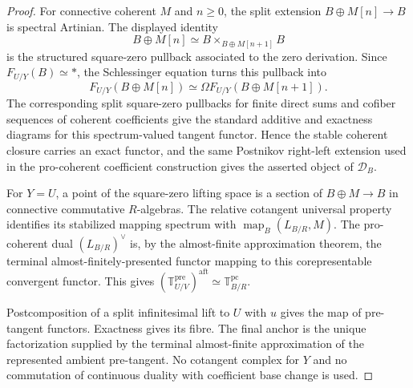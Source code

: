 \begin{proof}
For connective coherent $M$ and $n\geq0$, the split extension
$B\oplus M[n]\to B$ is spectral Artinian.  The displayed identity
\[
    B\oplus M[n]
    \simeq
    B\times_{B\oplus M[n+1]}B
\]
is the structured square-zero pullback associated to the zero derivation.
Since $F_{U/Y}(B)\simeq*$, the Schlessinger equation turns this pullback into
\[
    F_{U/Y}(B\oplus M[n])
    \simeq
    \Omega F_{U/Y}(B\oplus M[n+1]).
\]
The corresponding split square-zero pullbacks for finite direct sums and
cofiber sequences of coherent coefficients give the standard additive and
exactness diagrams for this spectrum-valued tangent functor.  Hence the
stable coherent closure carries an exact functor, and the same Postnikov
right-left extension used in the pro-coherent coefficient construction gives
the asserted object of $\mathcal D_B$.

For $Y=U$, a point of the square-zero lifting space is a section of
$B\oplus M\to B$ in connective commutative $R$-algebras.  The relative
cotangent universal property identifies its stabilized mapping spectrum with
$\operatorname{map}_B(L_{B/R},M)$.  The pro-coherent dual
$(L_{B/R})^\vee$ is, by the almost-finite approximation theorem, the terminal
almost-finitely-presented functor mapping to this corepresentable convergent
functor.  This gives
$\left(\mathbb T^{\mathrm{pre}}_{U/V}\right)^{\mathrm{aft}}
\simeq\mathbb T^{\mathrm{pc}}_{B/R}$.

Postcomposition of a split infinitesimal lift to $U$ with $u$ gives the map
of pre-tangent functors.  Exactness gives its fibre.  The final anchor is the
unique factorization supplied by the terminal almost-finite approximation of
the represented ambient pre-tangent.  No cotangent complex for $Y$ and no
commutation of continuous duality with coefficient base change is used.
\end{proof}


